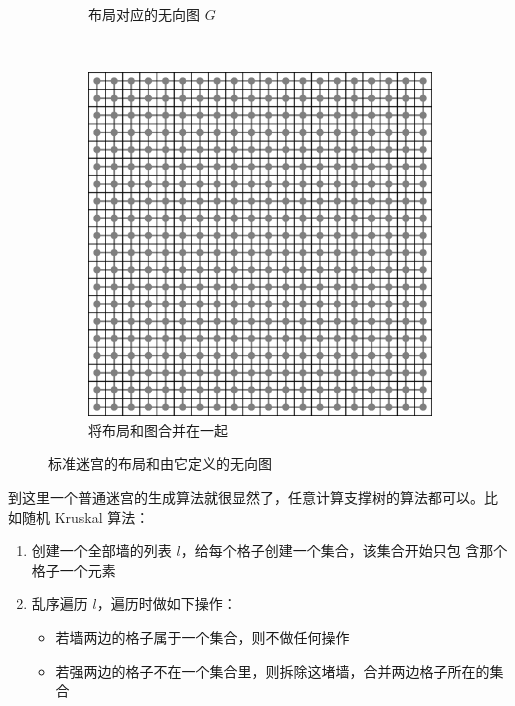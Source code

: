 \documentclass[cs4size,a4paper,adobefonts]{ctexart}
\begin{document}
\begin{figure}[htbp]
\begin{subfigure}[c]{0.31\textwidth}
    \caption{布局对应的无向图 $G$}
  \end{subfigure}
  ~
  \begin{subfigure}[c]{0.31\textwidth}
    \centering
    \includegraphics[width=\textwidth]{rectMerged}
    \caption{将布局和图合并在一起}
  \end{subfigure}
  \caption{标准迷宫的布局和由它定义的无向图}\label{fig:rectMazeGen}
\end{figure}

到这里一个普通迷宫的生成算法就很显然了，任意计算支撑树的算法都可以。比
如随机 Kruskal 算法：
\begin{enumerate}
\item 创建一个全部墙的列表 $l$，给每个格子创建一个集合，该集合开始只包
  含那个格子一个元素
\item 乱序遍历 $l$，遍历时做如下操作：
  \begin{itemize}
  \item 若墙两边的格子属于一个集合，则不做任何操作
  \item 若强两边的格子不在一个集合里，则拆除这堵墙，合并两边格子所在的集合
  \end{itemize}
\end{enumerate}
\end{document}
